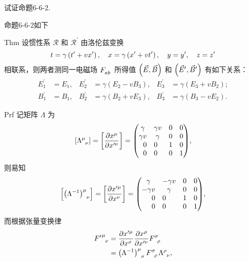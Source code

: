 \begin{xiti}
	\item 试证命题6-6-2.

	\begin{zm}
		命题6-6-2如下
		\begin{yl}{Thm}
			设惯性系 $\mathscr{R}$ 和 $\mathscr{R}^\prime$ 由洛伦兹变换
			\begin{equation*}
				t = \gamma \left( t^\prime + v x^\prime \right) \qc x = \gamma \left( x^\prime + v t^\prime \right) \qc y = y^\prime \qc z = z^\prime
			\end{equation*}
			相联系，则两者测同一电磁场 $\tensor{F}{_a_b}$ 所得值 $\left( \vec{E},\vec{B} \right)$ 和 $\left( \vec{E}^\prime , \vec{B}^\prime \right)$ 有如下关系：
			\begin{align*}
				E_1^\prime &= E_1, & E_2^\prime &= \gamma \left( E_2 - v B_3 \right), & E_3^\prime &= \gamma \left( E_3 + v B_2 \right);\\
				B_1^\prime &= B_1, & B_2^\prime &= \gamma \left( B_2 + v E_3 \right), & B_3^\prime &= \gamma \left( B_3 - v E_2 \right).
			\end{align*}
		\end{yl}
		\begin{yl}{Prf}
			记矩阵 $\Lambda$ 为
			\begin{equation*}
				\left[ \tensor{\Lambda}{^\mu_\nu} \right] = \left[ \pdv{x^\mu}{x^{\prime\nu}} \right] = \mqty( \mqty{ \gamma & \gamma v \\ \gamma v & \gamma }  & \mqty{\zmat{2}{2}} \\ \mqty{\zmat{2}{2}} & \mqty{\imat{2}} ),
			\end{equation*}
			则易知
			\begin{equation*}
				\left[ \tensor{\left(\Lambda^{-1}\right)}{^\mu_\nu} \right] = \left[ \pdv{x^{\prime\mu}}{x^{\nu}} \right] = \mqty( \mqty{ \gamma & - \gamma v \\ - \gamma v & \gamma }  & \mqty{\zmat{2}{2}} \\ \mqty{\zmat{2}{2}} & \mqty{\imat{2}} ),
			\end{equation*}
			而根据张量变换律
			\begin{equation*}
				\begin{split}
					\tensor{{F^\prime}}{^\mu_\nu} &= \pdv{x^{\prime\mu}}{x^\sigma} \pdv{x^\rho}{x^{\prime\nu}} \tensor{F}{^\sigma_\rho}\\
					&= \tensor{\left(\Lambda^{-1}\right)}{^\mu_\sigma} \tensor{F}{^\sigma_\rho} \tensor{\Lambda}{^\rho_\nu},
				\end{split}
			\end{equation*}

\end{yl}
\end{zm}
\end{xiti}
